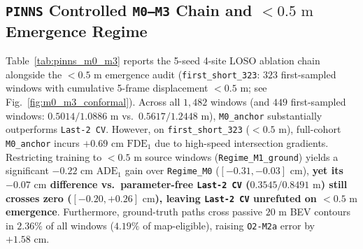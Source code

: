 \documentclass[journal]{IEEEtran}
\begin{document}
\subsection{\texttt{PINNS} Controlled \texttt{M0--M3} Chain and $<0.5\text{ m}$ Emergence Regime}
Table~\ref{tab:pinns_m0_m3} reports the 5-seed 4-site LOSO ablation chain alongside the $<0.5\text{ m}$ emergence audit (\texttt{first\_short\_323}: $323$ first-sampled windows with cumulative 5-frame displacement $<0.5\text{ m}$; see Fig.~\ref{fig:m0_m3_conformal}). Across all $1{,}482$ windows (and $449$ first-sampled windows: $0.5014 / 1.0886\text{ m}$ vs.\ $0.5617 / 1.2448\text{ m}$), \texttt{M0\_anchor} substantially outperforms \texttt{Last-2 CV}. However, on \texttt{first\_short\_323} ($<0.5\text{ m}$), full-cohort \texttt{M0\_anchor} incurs $+0.69\text{ cm}$ $\text{FDE}_1$ due to high-speed intersection gradients. Restricting training to $<0.5\text{ m}$ source windows (\texttt{Regime\_M1\_ground}) yields a significant $-0.22\text{ cm}$ $\text{ADE}_1$ gain over \texttt{Regime\_M0} ($[-0.31, -0.03]\text{ cm}$), \textbf{yet its $-0.07\text{ cm}$ difference vs.\ parameter-free \texttt{Last-2 CV} ($0.3545 / 0.8491\text{ m}$) still crosses zero ($[-0.20, +0.26]\text{ cm}$), leaving \texttt{Last-2 CV} unrefuted on $<0.5\text{ m}$ emergence}. Furthermore, ground-truth paths cross passive $20\text{ m}$ BEV contours in $2.36\%$ of all windows ($4.19\%$ of map-eligible), raising \texttt{O2-M2a} error by $+1.58\text{ cm}$.
\end{document}
